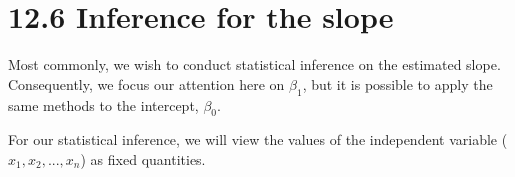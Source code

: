 \documentclass[letterpaper,10pt,english]{jupyterBook}
\begin{document}
\noindent{}


\section{12.6 Inference for the slope}
\label{\detokenize{12.g. Linear Regression I:inference-for-the-slope}}\label{\detokenize{12.g. Linear Regression I::doc}}
\sphinxAtStartPar
Most commonly, we wish to conduct statistical inference on the estimated slope. Consequently, we focus our attention here on \(\beta_1\), but it is possible to apply the same methods to the intercept, \(\beta_0\).

\sphinxAtStartPar
For our statistical inference, we will view the values of the independent variable (\(x_1, x_2, ..., x_n\)) as fixed quantities.
\end{document}
